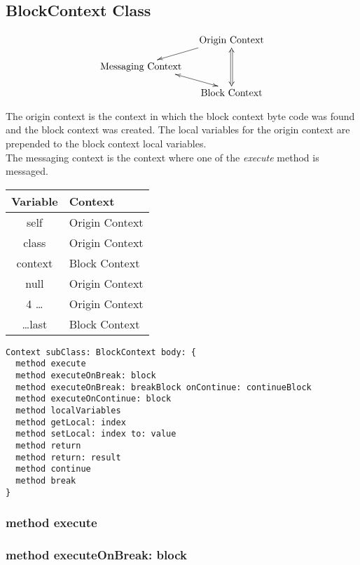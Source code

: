 \subsection {BlockContext Class}

\begin{displaymath}
  \xymatrix @-1pc {
    & \txt{Origin Context} \ar [dl] \ar@{<=>}[dd] \\
    \txt{Messaging Context} \ar@{<->}[dr] & \\
    & \txt{Block Context}\\
  }
\end{displaymath}

The origin context is the context in which the block context byte
code was found and the block context was created. The local variables for
the origin context are prepended to the block context local variables.\\

The messaging context is the context where one of the \textit{execute}
method is messaged.

\begin{center}
  \begin{tabular}{ c | l }
    Variable & Context \\ \hline
    self & Origin Context \\
    class & Origin Context \\
    context & Block Context \\
    null & Origin Context \\
    4 \dots & Origin Context \\
    \dots last & Block Context \\
  \end{tabular}
\end{center}


\begin{lstlisting}
Context subClass: BlockContext body: {
  method execute
  method executeOnBreak: block
  method executeOnBreak: breakBlock onContinue: continueBlock
  method executeOnContinue: block
  method localVariables
  method getLocal: index
  method setLocal: index to: value
  method return
  method return: result
  method continue
  method break
}
\end{lstlisting}

\subsubsection{method execute}

\subsubsection{method executeOnBreak: block}

